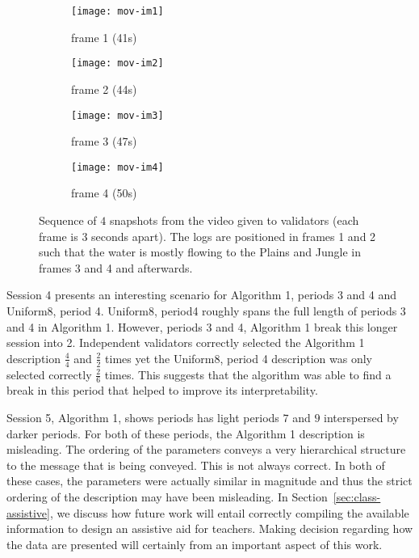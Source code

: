 \begin{appendices}
\begin{figure}
\centering
\begin{subfigure}{.24\textwidth}
  \centering
  \texttt{[image: mov-im1]}
  \caption{frame 1 (41s)}
\end{subfigure}%
\begin{subfigure}{.24\textwidth}
  \centering
  \texttt{[image: mov-im2]}
  \caption{frame 2 (44s)}
\end{subfigure}
\begin{subfigure}{.24\textwidth}
  \centering
  \texttt{[image: mov-im3]}
  \caption{frame 3 (47s)}
\end{subfigure}
\begin{subfigure}{.24\textwidth}
  \centering
  \texttt{[image: mov-im4]}
  \caption{frame 4 (50s)}
\end{subfigure}
\caption{Sequence of $4$ snapshots from the video given to validators (each frame is 3 seconds apart). The logs are positioned in frames 1 and 2 such that the water is mostly flowing to the Plains and Jungle in frames 3 and 4 and afterwards.}
\label{fig:test}
\end{figure}

Session 4 presents an interesting scenario for Algorithm 1, periods 3 and 4 and Uniform8, period 4. Uniform8, period4 roughly spans the full length of periods 3 and 4 in Algorithm 1. However, periods 3 and 4, Algorithm 1 break this longer session into 2. Independent validators correctly selected the Algorithm 1 description $\frac{4}{4}$ and $\frac{2}{2}$ times yet the Uniform8, period 4 description was only selected correctly $\frac{2}{6}$ times. This suggests that the algorithm was able to find a break in this period that helped to improve its interpretability.

Session 5, Algorithm 1, shows periods has light periods $7$ and $9$ interspersed by darker periods. For both of these periods, the Algorithm 1 description is misleading. The ordering of the parameters conveys a very hierarchical structure to the message that is being conveyed. This is not always correct. In both of these cases, the parameters were actually similar in magnitude and thus the strict ordering of the description may have been misleading. In Section~\ref{sec:class-assistive}, we discuss how future work will entail correctly compiling the available information to design an assistive aid for teachers. Making decision regarding how the data are presented will certainly from an important aspect of this work.


\end{appendices}
